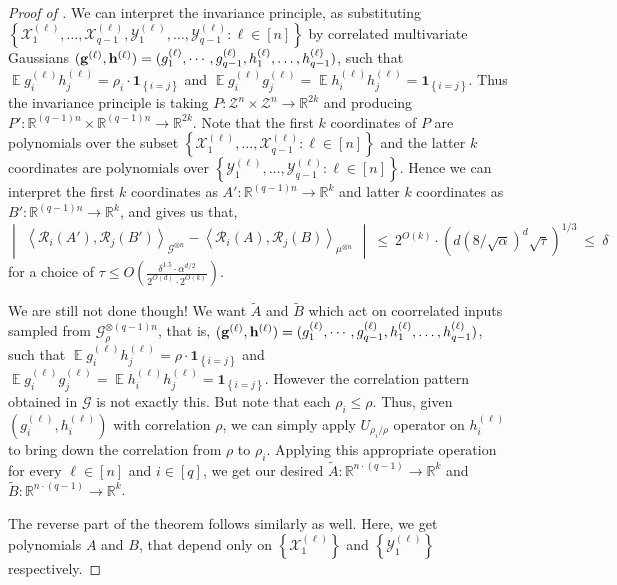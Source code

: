 \documentclass[11pt]{article}
\newcommand{\inbrace}[1]{\left \{ #1 \right \}}
\newcommand{\inparen}[1]{\left ( #1 \right )}
\newcommand{\inangle}[1]{\left \langle #1 \right \rangle}
\newcommand{\inabs}[1]{\begin{vmatrix} #1 \end{vmatrix}}
\newcommand{\set}[1]{\inbrace{#1}}
\newcommand{\setdef}[2]{\set{#1 : #2}}
\DeclareMathOperator*{\Ex}{\mathbb{E}}
\newcommand{\wtilde}[1]{\widetilde{#1}}
\newcommand{\bbR}{{\mathbb R}}
\newcommand{\calG}{\mathcal{G}}
\newcommand{\calR}{\mathcal{R}}
\newcommand{\calX}{\mathcal{X}}
\newcommand{\calY}{\mathcal{Y}}
\newcommand{\calZ}{\mathcal{Z}}
\begin{document}
\begin{proof}[Proof of ]
We can interpret the invariance principle, as substituting $\setdef{\calX^{(\ell)}_1, \ldots, \calX^{(\ell)}_{q-1}, \calY^{(\ell)}_1, \ldots, \calY^{(\ell)}_{q-1}}{\ell \in [n]}$ by correlated multivariate Gaussians $({\bf g}^{(\ell)}, {\bf h}^{(\ell)}) = (g^{(\ell)}_1, \cdots, g^{(\ell)}_{q-1}, h^{(\ell)}_1, \ldots, h^{(\ell)}_{q-1})$, such that $\Ex g^{(\ell)}_i h^{(\ell)}_j = \rho_i \cdot \mathbf{1}_{\set{i=j}}$ and $\Ex g^{(\ell)}_i g^{(\ell)}_j = \Ex h^{(\ell)}_i h^{(\ell)}_j = \mathbf{1}_{\set{i=j}}$. Thus the invariance principle is taking $P : \calZ^n \times \calZ^n \to \bbR^{2k}$ and producing $P' : \bbR^{(q-1)n} \times \bbR^{(q-1)n} \to \bbR^{2k}$. Note that the first $k$ coordinates of $P$ are polynomials over the subset $\setdef{\calX^{(\ell)}_1, \ldots, \calX^{(\ell)}_{q-1}}{\ell \in [n]}$ and the latter $k$ coordinates are polynomials over $\setdef{\calY^{(\ell)}_1, \ldots, \calY^{(\ell)}_{q-1}}{\ell \in [n]}$. Hence we can interpret the first $k$ coordinates as $A' : \bbR^{(q-1)n} \to \bbR^k$ and latter $k$ coordinates as $B' : \bbR^{(q-1)n} \to \bbR^k$, and  gives us that,
\[ \inabs{\inangle{\calR_i(A'), \calR_j(B')}_{\calG^{\otimes n}} - \inangle{\calR_i(A), \calR_j(B)}_{\mu^{\otimes n}}} ~\le~ 2^{O(k)} \cdot \inparen{d (8/\sqrt{\alpha})^d \sqrt{\tau}}^{1/3} ~\le~ \delta \]
for a choice of $\tau \le O\inparen{\frac{\delta^{1.5} \cdot \alpha^{d/2}}{2^{O(d)} \cdot 2^{O(k)}}}$.

We are still not done though! We want $\wtilde{A}$ and $\wtilde{B}$ which act on coorrelated inputs sampled from $\calG_\rho^{\otimes (q-1)n}$, that is, $({\bf g}^{(\ell)}, {\bf h}^{(\ell)}) = (g^{(\ell)}_1, \cdots, g^{(\ell)}_{q-1}, h^{(\ell)}_1, \ldots, h^{(\ell)}_{q-1})$, such that $\Ex g^{(\ell)}_i h^{(\ell)}_j = \rho \cdot \mathbf{1}_{\set{i=j}}$ and $\Ex g^{(\ell)}_i g^{(\ell)}_j = \Ex h^{(\ell)}_i h^{(\ell)}_j = \mathbf{1}_{\set{i=j}}$. However the correlation pattern obtained in $\calG$ is not exactly this. But note that each $\rho_i \le \rho$. Thus, given $(g^{(\ell)}_i, h^{(\ell)}_i)$ with correlation $\rho$, we can simply apply $U_{\rho_i/\rho}$ operator on $h^{(\ell)}_i$ to bring down the correlation from $\rho$ to $\rho_i$. Applying this appropriate operation for every $\ell \in [n]$ and $i \in [q]$, we get our desired $\wtilde{A} : \bbR^{n \cdot (q-1)} \to \bbR^k$ and $\wtilde{B} : \bbR^{n \cdot (q-1)} \to \bbR^k$.

The reverse part of the theorem follows similarly as well. Here, we get polynomials $A$ and $B$, that depend only on $\set{\calX^{(\ell)}_1}$ and $\set{\calY^{(\ell)}_1}$ respectively.
\end{proof}
\end{document}
